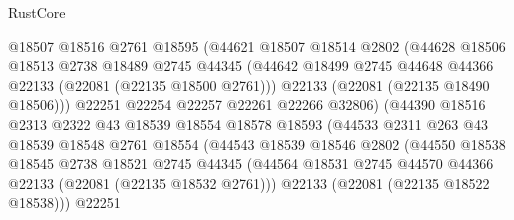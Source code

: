 \begin{lexlean}{RustCore}
\begin{coremodule}
                          @18507
                          @18516
                          @2761
                          @18595
                          (@44621
                            @18507
                            @18514
                            @2802
                            (@44628
                              @18506
                              @18513
                              @2738
                              @18489
                              @2745
                              @44345
                              (@44642
                                @18499
                                @2745
                                @44648
                                @44366
                                @22133
                                (@22081 (@22135 @18500 @2761)))
                              @22133
                              (@22081 (@22135 @18490 @18506)))
                            @22251
                            @22254
                            @22257
                            @22261
                            @22266
                            @32806)
                          (@44390
                            @18516
                            @2313
                            @2322
                            @43
                            @18539
                            @18554
                            @18578
                            @18593
                            (@44533
                              @2311
                              @263
                              @43
                              @18539
                              @18548
                              @2761
                              @18554
                              (@44543
                                @18539
                                @18546
                                @2802
                                (@44550
                                  @18538
                                  @18545
                                  @2738
                                  @18521
                                  @2745
                                  @44345
                                  (@44564
                                    @18531
                                    @2745
                                    @44570
                                    @44366
                                    @22133
                                    (@22081 (@22135 @18532 @2761)))
                                  @22133
                                  (@22081 (@22135 @18522 @18538)))
                                @22251

\end{coremodule}
\end{lexlean}
